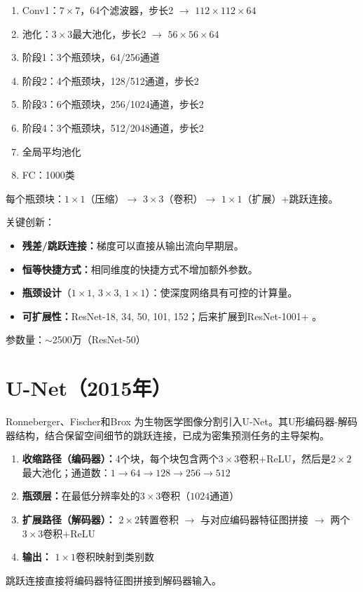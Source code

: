 \begin{architecture}
\begin{enumerate}
    \item Conv1：$7\times7$，64个滤波器，步长2 $\rightarrow$ $112\times112\times64$
    \item 池化：$3\times3$最大池化，步长2 $\rightarrow$ $56\times56\times64$
    \item 阶段1：3个瓶颈块，64/256通道
    \item 阶段2：4个瓶颈块，128/512通道，步长2
    \item 阶段3：6个瓶颈块，256/1024通道，步长2
    \item 阶段4：3个瓶颈块，512/2048通道，步长2
    \item 全局平均池化
    \item FC：1000类
\end{enumerate}
每个瓶颈块：$1\times1$（压缩）$\rightarrow$ $3\times3$（卷积）$\rightarrow$ $1\times1$（扩展）+跳跃连接。
\end{architecture}

关键创新：
\begin{itemize}
    \item \textbf{残差/跳跃连接：}梯度可以直接从输出流向早期层。
    \item \textbf{恒等快捷方式：}相同维度的快捷方式不增加额外参数。
    \item \textbf{瓶颈设计}（$1\times1$, $3\times3$, $1\times1$）：使深度网络具有可控的计算量。
    \item \textbf{可扩展性：}ResNet-18, 34, 50, 101, 152；后来扩展到ResNet-1001+ \cite{he2016identity}。
\end{itemize}

参数量：$\sim$2500万（ResNet-50）

\section{U-Net（2015年）}

Ronneberger、Fischer和Brox \cite{ronneberger2015u}为生物医学图像分割引入U-Net。其U形编码器-解码器结构，结合保留空间细节的跳跃连接，已成为密集预测任务的主导架构。

\begin{architecture}[U-Net架构]
\begin{enumerate}
    \item \textbf{收缩路径（编码器）：}4个块，每个块包含两个$3\times3$卷积+ReLU，然后是$2\times2$最大池化；通道数：$1 \rightarrow 64 \rightarrow 128 \rightarrow 256 \rightarrow 512$
    \item \textbf{瓶颈层：}在最低分辨率处的$3\times3$卷积（$1024$通道）
    \item \textbf{扩展路径（解码器）：} $2\times2$转置卷积 $\rightarrow$ 与对应编码器特征图拼接 $\rightarrow$ 两个$3\times3$卷积+ReLU
    \item \textbf{输出：} $1\times1$卷积映射到类别数
\end{enumerate}
跳跃连接直接将编码器特征图拼接到解码器输入。
\end{architecture}

